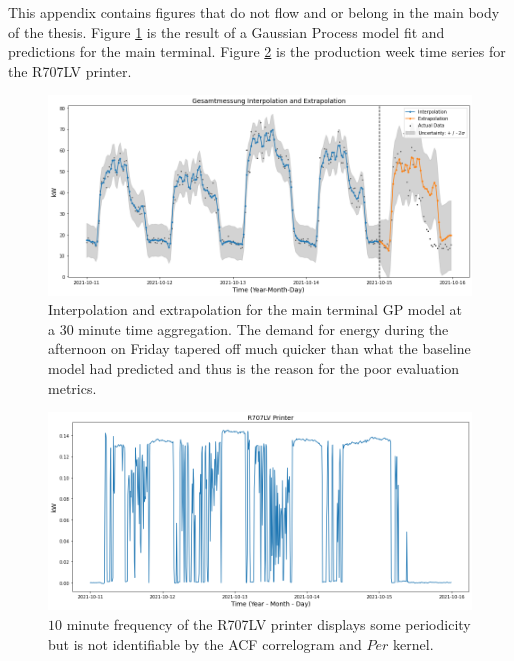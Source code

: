 This appendix contains figures that do not flow and or belong in the main body of the thesis. Figure \ref{fig:fig18} is the result of a Gaussian Process model fit and predictions for the main terminal. Figure \ref{fig:fig19} is the production week time series for the R707LV printer. 


\begin{figure}[h]
\centering
\graphicspath{ {./images/} }
\includegraphics[scale=0.49]{images/gesamtmessung_model.png}
\caption{Interpolation and extrapolation for the main terminal GP model at a $30$ minute time aggregation. The demand for energy during the afternoon on Friday tapered off much quicker than what the baseline model had predicted and thus is the reason for the poor evaluation metrics.}
\label{fig:fig18}
\end{figure}


\begin{figure}[H]
\centering
\graphicspath{ {./images/} }
\includegraphics[scale=0.49]{images/r707lv_printer.png}
\caption{$10$ minute frequency of the R707LV printer displays some periodicity but is not identifiable by the ACF correlogram and $Per$ kernel.}
\label{fig:fig19}
\end{figure}

